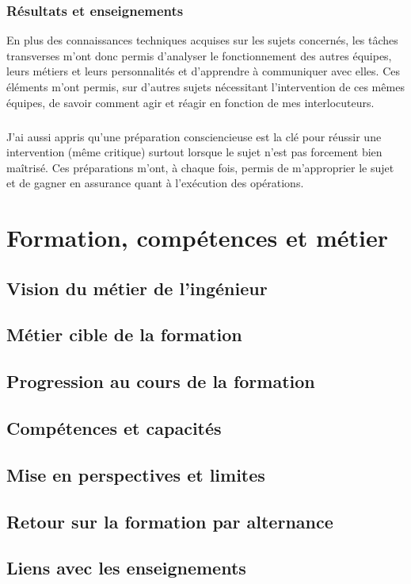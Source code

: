 \documentclass[a4paper,12pt]{report}
\begin{document}
\subsection{Résultats et enseignements}
En plus des connaissances techniques acquises sur les sujets concernés, les tâches transverses m'ont donc permis d'analyser le fonctionnement des autres équipes, leurs métiers et leurs personnalités et d'apprendre à communiquer avec elles. Ces éléments m'ont permis, sur d'autres sujets nécessitant l'intervention de ces mêmes équipes, de savoir comment agir et réagir en fonction de mes interlocuteurs.
\paragraph{}
J'ai aussi appris qu'une préparation consciencieuse est la clé pour réussir une intervention (même critique) surtout lorsque le sujet n'est pas forcement bien maîtrisé. Ces préparations m'ont, à chaque fois, permis de m'approprier le sujet et de gagner en assurance quant à l'exécution des opérations.

\chapter{Formation, compétences et métier}
\section{Vision du métier de l'ingénieur}
\section{Métier cible de la formation}
\section{Progression au cours de la formation}
\section{Compétences et capacités}
\section{Mise en perspectives et limites}
\section{Retour sur la formation par alternance}
\section{Liens avec les enseignements}
\end{document}
